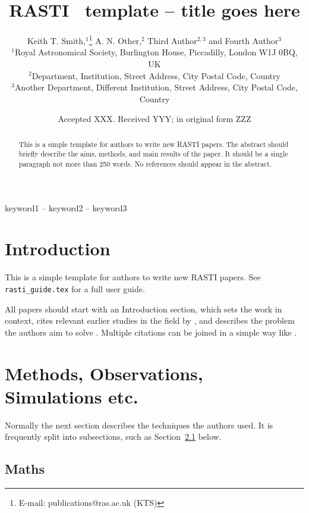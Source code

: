 \documentclass[fleqn,usenatbib]{rasti}
\title[Short title, max. 45 characters]{RASTI \LaTeXe\ template -- title goes here}
\author[K. T. Smith et al.]{
Keith T. Smith,$^{1}$\thanks{E-mail: publications@ras.ac.uk (KTS)}
A. N. Other,$^{2}$
Third Author$^{2,3}$
and Fourth Author$^{3}$
\\
$^{1}$Royal Astronomical Society, Burlington House, Piccadilly, London W1J 0BQ, UK\\
$^{2}$Department, Institution, Street Address, City Postal Code, Country\\
$^{3}$Another Department, Different Institution, Street Address, City Postal Code, Country
}
\date{Accepted XXX. Received YYY; in original form ZZZ}
\begin{document}
\label{firstpage}
\pagerange{\pageref{firstpage}--\pageref{lastpage}}
\maketitle

\begin{abstract}
This is a simple template for authors to write new RASTI papers.
The abstract should briefly describe the aims, methods, and main results of the paper.
It should be a single paragraph not more than 250 words.
No references should appear in the abstract.
\end{abstract}

\begin{keywords}
keyword1 -- keyword2 -- keyword3
\end{keywords}



\section{Introduction}

This is a simple template for authors to write new RASTI papers.
See \texttt{rasti\_guide.tex}
for a full user guide.

All papers should start with an Introduction section, which sets the work
in context, cites relevant earlier studies in the field by \citet{Fournier1901},
and describes the problem the authors aim to solve \citep[e.g.][]{vanDijk1902}.
Multiple citations can be joined in a simple way like \citet{deLaguarde1903, delaGuarde1904}.

\section{Methods, Observations, Simulations etc.}

Normally the next section describes the techniques the authors used.
It is frequently split into subsections, such as Section~\ref{sec:maths} below.

\subsection{Maths}
\label{sec:maths} %
\end{document}
